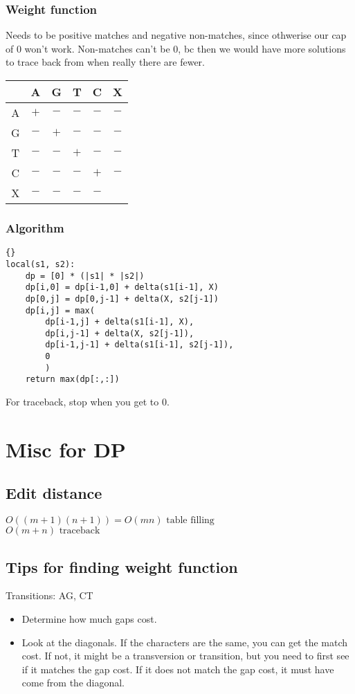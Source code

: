 \documentclass{article}
\begin{document}
\subsubsection*{Weight function}
Needs to be positive matches and negative non-matches, since othwerise our cap of 0 won't work. Non-matches can't be 0, bc then we would have more solutions to trace back from when really there are fewer.\\
\begin{tabular}{c|c c c c c}
     & A & G & T & C & X\\
     \hline
    A & $+$ & $-$ & $-$ & $-$ & $-$ \\
    G & $-$ & $+$ & $-$ & $-$ & $-$ \\
    T & $-$ & $-$ & $+$ & $-$ & $-$ \\
    C & $-$ & $-$ & $-$ & $+$ & $-$ \\
    X & $-$ & $-$ & $-$ & $-$ & \\
\end{tabular}
\subsubsection*{Algorithm}
\begin{lstlisting}{}
local(s1, s2):
    dp = [0] * (|s1| * |s2|)
    dp[i,0] = dp[i-1,0] + delta(s1[i-1], X)
    dp[0,j] = dp[0,j-1] + delta(X, s2[j-1])
    dp[i,j] = max(
        dp[i-1,j] + delta(s1[i-1], X),
        dp[i,j-1] + delta(X, s2[j-1]),
        dp[i-1,j-1] + delta(s1[i-1], s2[j-1]),
        0
        )
    return max(dp[:,:])
\end{lstlisting}
For traceback, stop when you get to 0.

\section{Misc for DP}
\subsection*{Edit distance}
$O((m+1)(n+1)) = O(mn) \textrm{ table filling}$\\
$O(m+n) \textrm{ traceback}$
\subsection*{Tips for finding weight function}
Transitions: AG, CT
\begin{itemize}
    \item Determine how much gaps cost.
    \item Look at the diagonals. If the characters are the same, you can get the match cost. If not, it might be a transversion or transition, but you need to first see if it matches the gap cost. If it does not match the gap cost, it must have come from the diagonal.
\end{itemize}
\end{document}
